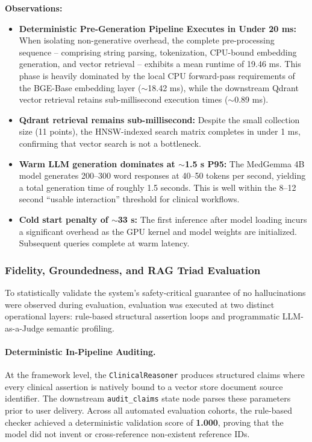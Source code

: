 \textbf{Observations:}
\begin{itemize}
    \item \textbf{Deterministic Pre-Generation Pipeline Executes in Under 20 ms:} When isolating non-generative overhead, the complete pre-processing sequence -- comprising string parsing, tokenization, CPU-bound embedding generation, and vector retrieval -- exhibits a mean runtime of 19.46 ms. This phase is heavily dominated by the local CPU forward-pass requirements of the BGE-Base embedding layer ($\sim$18.42 ms), while the downstream Qdrant vector retrieval retains sub-millisecond execution times ($\sim$0.89 ms).
    \item \textbf{Qdrant retrieval remains sub-millisecond:} Despite the small collection size (11 points), the HNSW-indexed search matrix completes in under 1 ms, confirming that vector search is not a bottleneck.
    \item \textbf{Warm LLM generation dominates at $\sim$1.5 s P95:} The MedGemma 4B model generates 200--300 word responses at 40--50 tokens per second, yielding a total generation time of roughly 1.5 seconds. This is well within the 8--12 second ``usable interaction'' threshold for clinical workflows.
    \item \textbf{Cold start penalty of $\sim$33 s:} The first inference after model loading incurs a significant overhead as the GPU kernel and model weights are initialized. Subsequent queries complete at warm latency.
\end{itemize}


\subsubsection{Fidelity, Groundedness, and RAG Triad Evaluation}
To statistically validate the system's safety-critical guarantee of no hallucinations were observed during evaluation, evaluation was executed at two distinct operational layers: rule-based structural assertion loops and programmatic LLM-as-a-Judge semantic profiling.

\paragraph{Deterministic In-Pipeline Auditing.} At the framework level, the \texttt{ClinicalReasoner} produces structured claims where every clinical assertion is natively bound to a vector store document source identifier. The downstream \texttt{audit\_claims} state node parses these parameters prior to user delivery. Across all automated evaluation cohorts, the rule-based checker achieved a deterministic validation score of \textbf{1.000}, proving that the model did not invent or cross-reference non-existent reference IDs.

